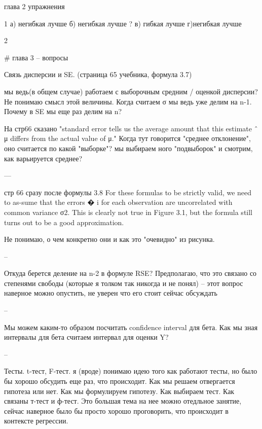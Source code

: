 глава 2
упражнения

1 а) негибкая лучше
б) негибкая лучше ?
в) гибкая лучше
г)негибкая лучше

2

# глава 3 -- вопросы

Связь дисперсии и SE.  
(страница 65 учебника, формула 3.7)

мы ведь(в общем случае) работаем с
выборочным средним / оценкой дисперсии? Не понимаю смысл этой
величины. 
Когда считаем σ  мы ведь уже делим на n-1. Почему в SE мы еще раз делим на n? 

На стр66 сказано "standard error tells us the average amount that this estimate ˆ μ differs from the actual value of μ."
Когда тут говорится "среднее отклонение", оно считается по какой "выборке"? мы выбираем ного "подвыборок" и смотрим, как варьируется среднее?

---

стр 66 сразу после формулы 3.8
For these formulas to be strictly valid, we need to as-sume that the errors � i for each observation are uncorrelated with common variance σ2. This is clearly not true in Figure 3.1, but the formula still turns out to be a good approximation.

Не понимаю, о чем конкретно они и как это "очевидно" из рисунка.

--

Откуда берется деление на n-2 в формуле RSE? Предполагаю, что это связано со степенями свободы (которые я толком так никогда и не понял) -- этот вопрос наверное можно опустить, не уверен что его стоит сейчас обсуждать

--

Мы можем каким-то образом посчитать confidence interval для бета. Как мы зная интервалы для бета считаем интервал для оценки Y?

--

Тесты. t-тест, F-тест.
я (вроде) понимаю идею того как работают тесты, но было бы хорошо обсудить еще раз, что происходит. 
Как мы решаем отвергается гипотеза или нет. Как мы формулируем гипотезу. Как выбираем тест. 
Как связаны т-тест и ф-тест.
Это большая тема на нее можно отедльное занятие, сейчас наверное было бы просто хорошо проговорить, что происходит в контексте регрессии.